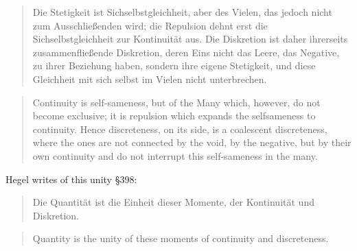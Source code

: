 \documentclass{article}
\begin{document}
\begin{quote}
    Die Stetigkeit ist Sichselbstgleichheit, aber des Vielen, das jedoch nicht zum Ausschließenden wird; die Repulsion dehnt erst die Sichselbstgleichheit zur Kontinuität aus. Die Diskretion ist daher ihrerseits zusammenfließende Diskretion, deren Eins nicht das Leere, das Negative, zu ihrer Beziehung haben, sondern ihre eigene Stetigkeit, und diese Gleichheit mit sich selbst im Vielen nicht unterbrechen.
\end{quote}

\begin{quote}
    Continuity is self-sameness, but of the Many which, however, do not become exclusive; it is repulsion which expands the selfsameness to continuity. Hence discreteness, on its side, is a coalescent discreteness, where the ones are not connected by the void, by the negative, but by their own continuity and do not interrupt this self-sameness in the many.
\end{quote}

Hegel writes of this unity §398:

\begin{quote}
    Die Quantität ist die Einheit dieser Momente, der Kontinuität und Diskretion.
\end{quote}

\begin{quote}
    Quantity is the unity of these moments of continuity and discreteness.
\end{quote}
\end{document}
